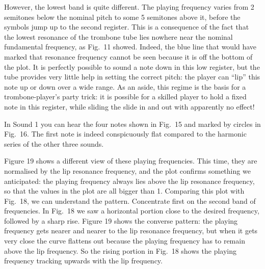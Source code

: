 
  However, the lowest band is quite different. The playing frequency varies 
  from 2 semitones below the nominal pitch to some 5 semitones above it, before 
  the symbols jump up to the second register. This is a consequence of the fact 
  that the lowest resonance of the trombone tube lies nowhere near the nominal 
  fundamental frequency, as Fig.\ 11 showed. Indeed, the blue line that would 
  have marked that resonance frequency cannot be seen because it is off the 
  bottom of the plot. It is perfectly possible to sound a note down in this low 
  register, but the tube provides very little help in setting the correct 
  pitch: the player can “lip” this note up or down over a wide range. As an 
  aside, this regime is the basis for a trombone-player’s party trick: it is 
  possible for a skilled player to hold a fixed note in this register, while 
  sliding the slide in and out with apparently no effect! 

  In Sound 1 you can hear the four notes shown in Fig.\ 15 and marked by 
  circles in Fig.\ 16. The first note is indeed conspicuously flat compared to 
  the harmonic series of the other three sounds. 

\audio{}

  Figure 19 shows a different view of these playing frequencies. This time, 
  they are normalised by the lip resonance frequency, and the plot confirms 
  something we anticipated: the playing frequency always lies above the lip 
  resonance frequency, so that the values in the plot are all bigger than 1. 
  Comparing this plot with Fig.\ 18, we can understand the pattern. Concentrate 
  first on the second band of frequencies. In Fig.\ 18 we saw a horizontal 
  portion close to the desired frequency, followed by a sharp rise. Figure 19 
  shows the converse pattern: the playing frequency gets nearer and nearer to 
  the lip resonance frequency, but when it gets very close the curve flattens 
  out because the playing frequency has to remain above the lip frequency. So 
  the rising portion in Fig.\ 18 shows the playing frequency tracking upwards 
  with the lip frequency. 


